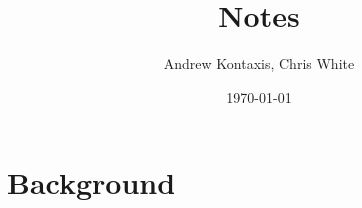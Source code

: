 \documentclass[11pt,a4paper]{article}
\title{Notes}
\author{Andrew Kontaxis, Chris White}
\date{\today}
\begin{document}
\maketitle

\section{Background}

%
\end{document}
